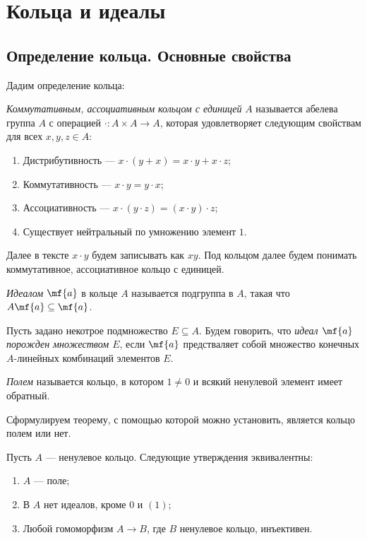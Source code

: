 \section{Кольца и идеалы}
    \subsection{Определение кольца. Основные свойства}
    Дадим определение кольца:
    \begin{Def}
        \textit{Коммутативным, ассоциативным кольцом с единицей} $A$ называется абелева группа $A$ 
        с операцией $\cdot : A \times A \rightarrow A$, которая удовлетворяет следующим свойствам для всех $x, y, z \in A$:
        \begin{enumerate}
            \item Дистрибутивность --- $x \cdot (y + x) = x\cdot y + x\cdot z$;
            \item Коммутативность --- $x \cdot y = y \cdot x$;
            \item Ассоциативность --- $x\cdot(y \cdot z) = (x \cdot y) \cdot z$;
            \item Существует нейтральный по умножению элемент $1$.
        \end{enumerate}
    \end{Def}
    Далее в тексте $x \cdot y$ будем записывать как $xy$. Под кольцом далее будем понимать коммутативное, ассоциативное кольцо с единицей. 
    
    \begin{Def}
        \textit{Идеалом} $\mf{a}$ в кольце $A$ называется подгруппа в $A$, такая что $A\mf{a} \subseteq \mf{a}$.
    \end{Def}

    \begin{Def}
        Пусть задано некотрое подмножество $E \subseteq A$. Будем говорить, что \textit{ идеал $\mf{a}$ порожден множеством $E$}, если $\mf{a}$ предстваляет собой множество
        конечных $A$-линейных комбинаций элементов $E$.
    \end{Def}

    \begin{Def}
        \textit{Полем} называется кольцо, в котором $1 \neq 0$ и всякий ненулевой элемент имеет обратный.
    \end{Def}

    Сформулируем теорему, с помощью которой можно установить, является кольцо полем или нет.
    \begin{Theorem}\cite{A-M}
        Пусть $A$ --- ненулевое кольцо. Следующие утверждения эквивалентны:
        \begin{enumerate}
            \item $A$ --- поле;
            \item В $A$ нет идеалов, кроме $0$ и $(1)$;
            \item Любой гомоморфизм $A \rightarrow B$, где $B$ ненулевое кольцо, инъективен.
        \end{enumerate}
    \end{Theorem}


